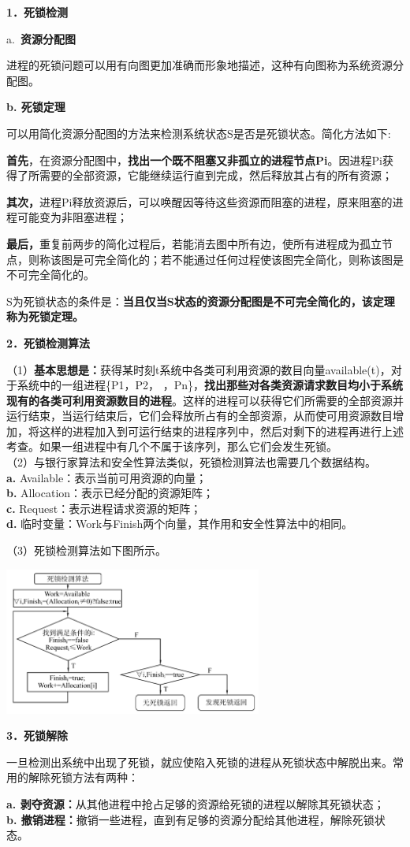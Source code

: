 \textbf{{1．死锁检测}}

{a.~}\textbf{资源分配图}

进程的死锁问题可以用有向图更加准确而形象地描述，这种有向图称为系统资源分配图。

\textbf{b. 死锁定理}

可以用简化资源分配图的方法来检测系统状态S是否是死锁状态。简化方法如下:

\textbf{首先}，在资源分配图中，\textbf{找出一个既不阻塞又非孤立的进程节点Pi}。因进程Pi获得了所需要的全部资源，它能继续运行直到完成，然后释放其占有的所有资源；

\textbf{其次，}进程Pi释放资源后，可以唤醒因等待这些资源而阻塞的进程，原来阻塞的进程可能变为非阻塞进程；

\textbf{最后，}重复前两步的简化过程后，若能消去图中所有边，使所有进程成为孤立节点，则称该图是可完全简化的；若不能通过任何过程使该图完全简化，则称该图是不可完全简化的。

S为死锁状态的条件是：\textbf{{当且仅当S状态的资源分配图是不可完全简化的，该定理称为死锁定理}。}

\textbf{{2．死锁检测算法}}

（1）\textbf{基本思想是：}获得某时刻t系统中各类可利用资源的数目向量available(t)，对于系统中的一组进程\{P1，P2，
，Pn\}，\textbf{找出那些对各类资源请求数目均小于系统现有的各类可利用资源数目的进程}。这样的进程可以获得它们所需要的全部资源并运行结束，当运行结束后，它们会释放所占有的全部资源，从而使可用资源数目增加，将这样的进程加入到可运行结束的进程序列中，然后对剩下的进程再进行上述考查。如果一组进程中有几个不属于该序列，那么它们会发生死锁。\\
（2）与银行家算法和安全性算法类似，死锁检测算法也需要几个数据结构。\\
\textbf{a.} Available：表示当前可用资源的向量；\\
\textbf{b.} Allocation：表示已经分配的资源矩阵；\\
\textbf{c.} Request：表示进程请求资源的矩阵；\\
\textbf{d.} 临时变量：Work与Finish两个向量，其作用和安全性算法中的相同。

（3）死锁检测算法如下图所示。

\includegraphics[width=3.33333in,height=1.90625in]{png-jpeg-pics/62353A91665DA4A4DE8E386B13D7AE31.png}

\textbf{{3．死锁解除}}

一旦检测出系统中出现了死锁，就应使陷入死锁的进程从死锁状态中解脱出来。{常用的解除死锁方法有两种：}

\textbf{a.
剥夺资源：}从其他进程中抢占足够的资源给死锁的进程以解除其死锁状态；\\
\textbf{b.
撤销进程：}撤销一些进程，直到有足够的资源分配给其他进程，解除死锁状态。
